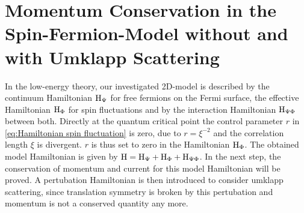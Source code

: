 \section{Momentum Conservation in the Spin-Fermion-Model without and with Umklapp Scattering}
\label{sec:umklapp scattering}
%
%
In the low-energy theory, our investigated 2D-model is described by the continuum Hamiltonian $\mathrm{H}_{\Psi}$ for free fermions on the Fermi surface, the effective Hamiltonian $\mathrm{H}_{\Phi}$ for spin fluctuations and by the interaction Hamiltonian $\mathrm{H}_{\Psi\Phi}$ between both.
Directly at the quantum critical point the control parameter $r$ in \eqref{eq:Hamiltonian spin fluctuation} is zero, due to $r = \xi^{-2}$ and the correlation length $\xi$ is divergent.
$r$ is thus set to zero in the Hamiltonian $\mathrm{H}_{\Phi}$.
The obtained model Hamiltonian is given by $\mathrm{H} = \mathrm{H}_{\Psi} + \mathrm{H}_{\Phi} + \mathrm{H}_{\Psi\Phi}$.
In the next step, the conservation of momentum and current for this model Hamiltonian will be proved.
A pertubation Hamiltonian is then introduced to consider umklapp scattering, since translation symmetry is broken by this pertubation and momentum is not a conserved quantity any more.

